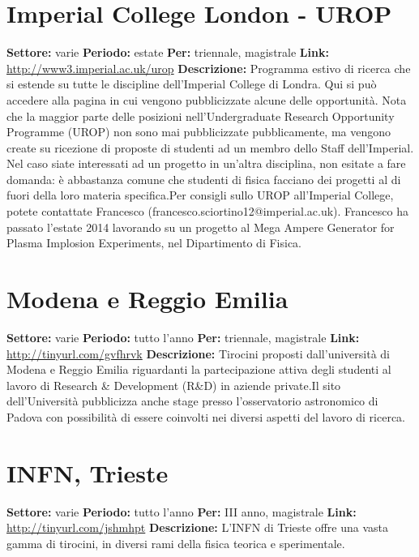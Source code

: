 \documentclass[a4paper,10pt]{article}
\begin{document}
\section{Imperial College London - UROP}
\textbf{Settore:} varie\newline
\textbf{Periodo:} estate\newline
\textbf{Per:} triennale, magistrale\newline
\textbf{Link:} \url{http://www3.imperial.ac.uk/urop} \newline
\textbf{Descrizione:}  Programma estivo di ricerca che si estende su tutte le discipline dell’Imperial College di Londra. Qui si può accedere alla pagina in cui vengono pubblicizzate alcune delle opportunità. Nota che la maggior parte delle posizioni nell'Undergraduate Research Opportunity Programme (UROP) non sono mai pubblicizzate pubblicamente, ma vengono create su ricezione di proposte di studenti ad un membro dello Staff dell'Imperial. Nel caso siate interessati ad un progetto in un’altra disciplina, non esitate a fare domanda: è abbastanza comune che studenti di fisica facciano dei progetti al di fuori della loro materia specifica.Per consigli sullo UROP all'Imperial College, potete contattate Francesco (francesco.sciortino12@imperial.ac.uk). Francesco ha passato l'estate 2014 lavorando su un progetto al Mega Ampere Generator for Plasma Implosion Experiments, nel Dipartimento di Fisica.   

\section{Modena e Reggio Emilia}
\textbf{Settore:} varie\newline
\textbf{Periodo:} tutto l'anno\newline
\textbf{Per:} triennale, magistrale\newline
\textbf{Link:} \url{http://tinyurl.com/gvfhrvk} \newline
\textbf{Descrizione:} Tirocini proposti dall’università di Modena e Reggio Emilia riguardanti la partecipazione attiva degli studenti al lavoro di Research \& Development (R\&D) in aziende private.Il sito dell’Università pubblicizza anche stage presso l’osservatorio astronomico di Padova con possibilità di essere coinvolti nei diversi aspetti del lavoro di ricerca.  

\section{INFN, Trieste}	
\textbf{Settore:} varie\newline
\textbf{Periodo:} tutto l'anno\newline
\textbf{Per:} III anno, magistrale\newline
\textbf{Link:} \url{http://tinyurl.com/jshmhpt} \newline
\textbf{Descrizione:} L’INFN di Trieste offre una vasta gamma di tirocini, in diversi rami della fisica teorica e sperimentale.	
\end{document}
